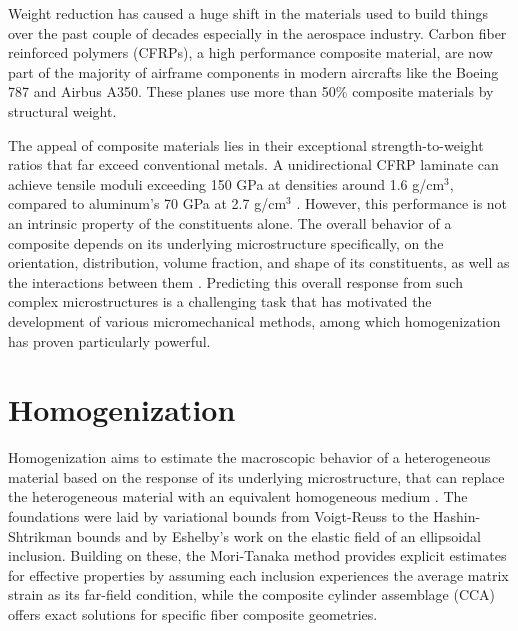 \documentclass[oneside, 12pt, a4paper, bibliography=totoc]{book}
\begin{document}
Weight reduction has caused a huge shift in the materials used to build things over the past couple of decades especially in the aerospace industry. Carbon fiber reinforced polymers (CFRPs), a high performance composite material, are now part of the majority of airframe components in modern aircrafts like the Boeing 787 and Airbus A350. These planes use more than 50\% composite materials by structural weight\cite{Soutis2005}. 

The appeal of composite materials lies in their exceptional strength-to-weight ratios that far exceed conventional metals. A unidirectional CFRP laminate can achieve tensile moduli exceeding 150 GPa at densities around 1.6 g/cm$^3$, compared to aluminum's 70 GPa at 2.7 g/cm$^3$ \cite{Chawla2019}. However, this performance is not an intrinsic property of the constituents alone. The overall behavior of a composite depends on its underlying microstructure specifically, on the orientation, distribution, volume fraction, and shape of its constituents, as well as the interactions between them \cite{Firooz2021}. Predicting this overall response from such complex microstructures is a challenging task that has motivated the development of various micromechanical methods, among which homogenization has proven particularly powerful.

\section{Homogenization}
\label{sec:homogenization_review}

Homogenization aims to estimate the macroscopic behavior of a heterogeneous material based on the response of its underlying microstructure, that can replace the heterogeneous material with an equivalent homogeneous medium \cite{Hill1963}. The foundations were laid by variational bounds from Voigt-Reuss \cite{Voigt1889, Reuss1929} to the Hashin-Shtrikman bounds \cite{Hashin1963} and by Eshelby's work \cite{Eshelby1957} on the elastic field of an ellipsoidal inclusion. Building on these, the Mori-Tanaka method \cite{Mori1973, Benveniste1987} provides explicit estimates for effective properties by assuming each inclusion experiences the average matrix strain as its far-field condition, while the composite cylinder assemblage (CCA) \cite{Hashin1964} offers exact solutions for specific fiber composite geometries.
\end{document}
